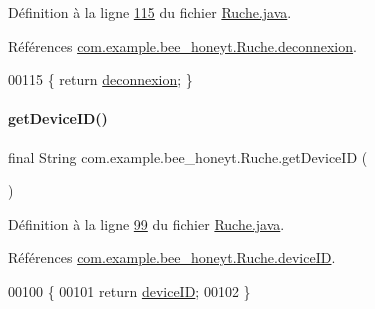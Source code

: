 Définition à la ligne \hyperlink{_ruche_8java_source_l00115}{115} du fichier \hyperlink{_ruche_8java_source}{Ruche.\+java}.



Références \hyperlink{_ruche_8java_source_l00022}{com.\+example.\+bee\+\_\+honeyt.\+Ruche.\+deconnexion}.


\begin{DoxyCode}
00115 \{ \textcolor{keywordflow}{return} \hyperlink{classcom_1_1example_1_1bee__honeyt_1_1_ruche_a91168fb786c93a5233138f67b6a121ad}{deconnexion}; \}
\end{DoxyCode}
\mbox{\label{classcom_1_1example_1_1bee__honeyt_1_1_ruche_a4960ba8542f507c850978b939b9aa9e5}} 
\paragraph{\texorpdfstring{get\+Device\+I\+D()}{getDeviceID()}}
{\footnotesize\ttfamily final String com.\+example.\+bee\+\_\+honeyt.\+Ruche.\+get\+Device\+ID (\begin{DoxyParamCaption}{ }\end{DoxyParamCaption})}



Définition à la ligne \hyperlink{_ruche_8java_source_l00099}{99} du fichier \hyperlink{_ruche_8java_source}{Ruche.\+java}.



Références \hyperlink{_ruche_8java_source_l00019}{com.\+example.\+bee\+\_\+honeyt.\+Ruche.\+device\+ID}.


\begin{DoxyCode}
00100     \{
00101         \textcolor{keywordflow}{return} \hyperlink{classcom_1_1example_1_1bee__honeyt_1_1_ruche_a7126c2ff9e0b3b5365e042c5309ad775}{deviceID};
00102     \}
\end{DoxyCode}
\mbox{\label{classcom_1_1example_1_1bee__honeyt_1_1_ruche_a864e48de51e9b0e8e5c78ed7fe58a2d9}} 

